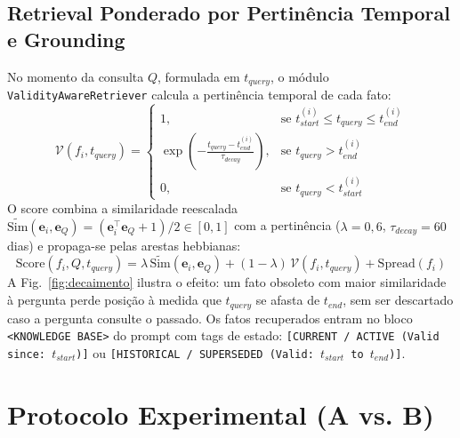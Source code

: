 \documentclass[10pt,conference,twocolumn]{IEEEtran}
\begin{document}
\subsection{Retrieval Ponderado por Pertinência Temporal e Grounding}
No momento da consulta $Q$, formulada em $t_{query}$, o módulo \texttt{ValidityAwareRetriever} calcula a pertinência temporal de cada fato:
\begin{equation}
\mathcal{V}(f_i, t_{query}) =
\begin{cases}
1, & \text{se } t_{start}^{(i)} \le t_{query} \le t_{end}^{(i)} \\
\exp\left(-\frac{t_{query} - t_{end}^{(i)}}{\tau_{decay}}\right), & \text{se } t_{query} > t_{end}^{(i)} \\
0, & \text{se } t_{query} < t_{start}^{(i)}
\end{cases}
\end{equation}
O score combina a similaridade reescalada $\widetilde{\text{Sim}}(\mathbf{e}_i, \mathbf{e}_Q) = (\mathbf{e}_i^\top \mathbf{e}_Q + 1)/2 \in [0,1]$ com a pertinência ($\lambda = 0{,}6$, $\tau_{decay} = 60$ dias) e propaga-se pelas arestas hebbianas:
\begin{equation}
\text{Score}(f_i, Q, t_{query}) = \lambda \, \widetilde{\text{Sim}}(\mathbf{e}_i, \mathbf{e}_Q) + (1-\lambda) \, \mathcal{V}(f_i, t_{query}) + \text{Spread}(f_i)
\end{equation}
A Fig.~\ref{fig:decaimento} ilustra o efeito: um fato obsoleto com maior similaridade à pergunta perde posição à medida que $t_{query}$ se afasta de $t_{end}$, sem ser descartado caso a pergunta consulte o passado. Os fatos recuperados entram no bloco \texttt{<KNOWLEDGE BASE>} do prompt com tags de estado: \texttt{[CURRENT / ACTIVE (Valid since: $t_{start}$)]} ou \texttt{[HISTORICAL / SUPERSEDED (Valid: $t_{start}$ to $t_{end}$)]}.

\section{Protocolo Experimental (A vs. B)}
\end{document}
